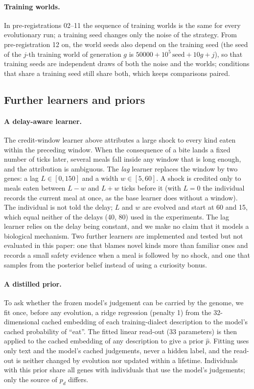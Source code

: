 \paragraph{Training worlds.}
In pre-registrations 02--11 the sequence of training worlds is the same for every evolutionary run; a training seed changes only the noise of the strategy. From pre-registration 12 on, the world seeds also depend on the training seed (the seed of the $j$-th training world of generation $g$ is $50000+10^5\,\mathrm{seed}+10g+j$), so that training seeds are independent draws of both the noise and the worlds; conditions that share a training seed still share both, which keeps comparisons paired.

\subsection{Further learners and priors}
\label{sec:learners}
\paragraph{A delay-aware learner.}
The credit-window learner above attributes a large shock to every kind eaten within the preceding window. When the consequence of a bite lands a fixed number of ticks later, several meals fall inside any window that is long enough, and the attribution is ambiguous. The \emph{lag} learner replaces the window by two genes: a lag $L\in[0,150]$ and a width $w\in[5,60]$. A shock is credited only to meals eaten between $L-w$ and $L+w$ ticks before it (with $L=0$ the individual records the current meal at once, as the base learner does without a window). The individual is not told the delay; $L$ and $w$ are evolved and start at 60 and 15, which equal neither of the delays (40, 80) used in the experiments. The lag learner relies on the delay being constant, and we make no claim that it models a biological mechanism. Two further learners are implemented and tested but not evaluated in this paper: one that blames novel kinds more than familiar ones and records a small safety evidence when a meal is followed by no shock, and one that samples from the posterior belief instead of using a curiosity bonus.

\paragraph{A distilled prior.}
To ask whether the frozen model's judgement can be carried by the genome, we fit once, before any evolution, a ridge regression (penalty 1) from the 32-dimensional cached embedding of each training-dialect description to the model's cached probability of ``eat''. The fitted linear read-out (33 parameters) is then applied to the cached embedding of any description to give a prior $\hat p$. Fitting uses only text and the model's cached judgements, never a hidden label, and the read-out is neither changed by evolution nor updated within a lifetime. Individuals with this prior share all genes with individuals that use the model's judgements; only the source of $p_d$ differs.
